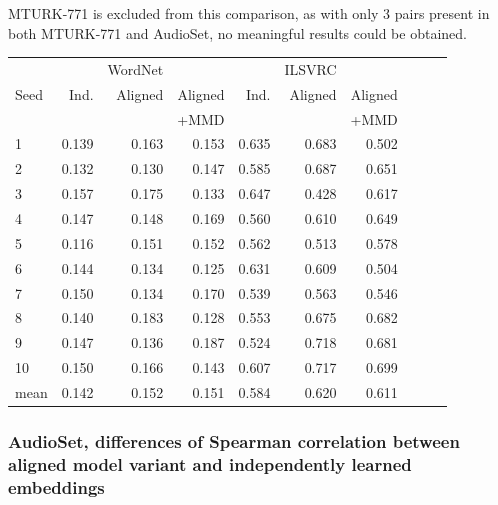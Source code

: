 MTURK-771 is excluded from this comparison, as with only 3 pairs present in both MTURK-771 and AudioSet, no meaningful results could be obtained. 

\begin{table}[H]
\centering
\begin{tabular}{lrrrrrrrrr}
  \toprule
       &       &   WordNet &           &      &  ILSVRC   &            \\
{Seed} &  Ind. &   Aligned &  Aligned  & Ind. &   Aligned &  Aligned   \\
{}     &       &           & +MMD      &      &           &   +MMD     \\
\midrule
1    &    0.139 &  0.163 &   0.153 &   0.635 &  0.683 &   0.502 &   \\
2    &    0.132 &  0.130 &   0.147 &   0.585 &  0.687 &   0.651 &  \\
3    &    0.157 &  0.175 &   0.133 &   0.647 &  0.428 &   0.617 &  \\
4    &    0.147 &  0.148 &   0.169 &   0.560 &  0.610 &   0.649 &  \\
5    &    0.116 &  0.151 &   0.152 &   0.562 &  0.513 &   0.578 &  \\
6    &    0.144 &  0.134 &   0.125 &   0.631 &  0.609 &   0.504 &  \\
7    &    0.150 &  0.134 &   0.170 &   0.539 &  0.563 &   0.546 &  \\
8    &    0.140 &  0.183 &   0.128 &   0.553 &  0.675 &   0.682 &  \\
9    &    0.147 &  0.136 &   0.187 &   0.524 &  0.718 &   0.681 &  \\
10   &    0.150 &  0.166 &   0.143 &   0.607 &  0.717 &   0.699 &  \\
\midrule                                                                   
mean &    0.142 &  0.152 &   0.151 &   0.584 &  0.620 &   0.611 &  \\
\bottomrule
\end{tabular}
\end{table}



\subsubsection{AudioSet, differences of Spearman correlation between aligned model variant and independently learned embeddings}



